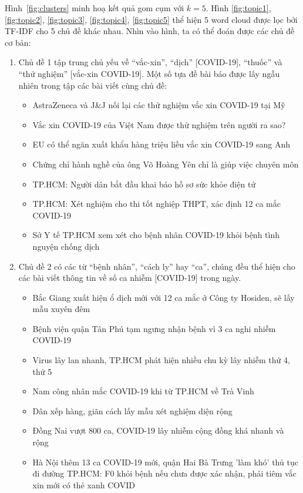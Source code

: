 Hình~\ref{fig:clusters} minh hoạ kết quả gom cụm với $k=5$. Hình \ref{fig:topic1}, \ref{fig:topic2}, \ref{fig:topic3}, \ref{fig:topic4}, \ref{fig:topic5} thể hiện 5 word cloud được lọc bởi TF-IDF cho 5 chủ đề khác nhau. Nhìn vào hình, ta có thể đoán được các chủ đề cơ bản:
\begin{enumerate}

    \item Chủ đề 1 tập trung chủ yếu về ``vắc-xin'', ``dịch'' [COVID-19], ``thuốc'' và ``thử nghiệm'' [vắc-xin COVID-19]. Một số tựa đề bài báo được lấy ngẫu nhiên trong tập các bài viết cùng chủ đề:
        \begin{itemize}
            \item AstraZeneca và J\&J nối lại các thử nghiệm vắc xin COVID-19 tại Mỹ
            \item Vắc xin COVID-19 của Việt Nam được thử nghiệm trên người ra sao?
            \item EU có thể ngăn xuất khẩu hàng triệu liều vắc xin COVID-19 sang Anh
            \item Chứng chỉ hành nghề của ông Võ Hoàng Yên chỉ là giúp việc chuyên môn
            \item TP.HCM: Người dân bắt đầu khai báo hồ sơ sức khỏe điện tử
            \item TP.HCM: Xét nghiệm cho thi tốt nghiệp THPT, xác định 12 ca mắc COVID-19
            \item Sở Y tế TP.HCM xem xét cho bệnh nhân COVID-19 khỏi bệnh tình nguyện chống dịch
        \end{itemize}


    \item Chủ đề 2 có các từ ``bệnh nhân'', ``cách ly'' hay ``ca'', chúng đều thể hiện cho các bài viết thông tin về số ca nhiễm [COVID-19] trong ngày.
        \begin{itemize}
            \item Bắc Giang xuất hiện ổ dịch mới với 12 ca mắc ở Công ty Hosiden, sẽ lấy mẫu xuyên đêm
            \item Bệnh viện quận Tân Phú tạm ngưng nhận bệnh vì 3 ca nghi nhiễm COVID-19
            \item Virus lây lan nhanh, TP.HCM phát hiện nhiều chu kỳ lây nhiễm thứ 4, thứ 5
            \item Nam công nhân mắc COVID-19 khi từ TP.HCM về Trà Vinh
            \item Dân xếp hàng, giãn cách lấy mẫu xét nghiệm diện rộng
            \item Đồng Nai vượt 800 ca, COVID-19 lây nhiễm cộng đồng khá nhanh và rộng
            \item Hà Nội thêm 13 ca COVID-19 mới, quận Hai Bà Trưng 'làm khó' thủ tục đi đường
            TP.HCM: F0 khỏi bệnh nếu chưa được xác nhận, phải tiêm vắc xin mới có thẻ xanh COVID
        \end{itemize}


\end{enumerate}
